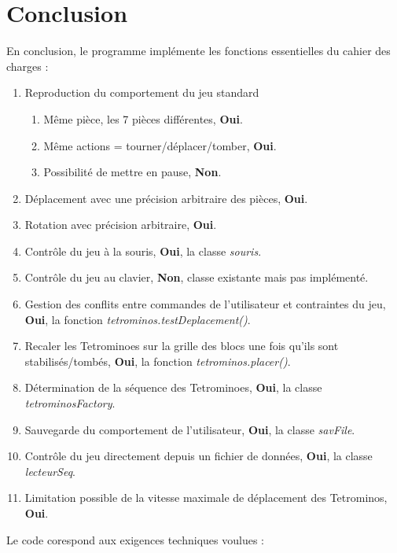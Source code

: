 \documentclass{article}           %
\begin{document}
\section{Conclusion}               %

En conclusion, le programme implémente les fonctions essentielles du cahier des charges :

\begin{enumerate}
  \item Reproduction du comportement du jeu standard 
  		\begin{enumerate}
		  \item Même pièce, les 7 pièces différentes, \textbf{Oui}.	
		  \item Même actions = tourner/déplacer/tomber, \textbf{Oui}.
		  \item Possibilité de mettre en pause, \textbf{Non}.
		\end{enumerate}

  \item Déplacement avec une précision arbitraire des pièces, \textbf{Oui}.
  \item Rotation avec précision arbitraire, \textbf{Oui}.
  \item Contrôle du jeu à la souris, \textbf{Oui}, la classe \emph{souris}.
  \item Contrôle du jeu au clavier, \textbf{Non}, classe existante mais pas implémenté.
  \item Gestion des conflits entre commandes de l'utilisateur et contraintes du jeu, \textbf{Oui}, la fonction \emph{tetrominos.testDeplacement()}.
  \item Recaler les Tetrominoes sur la grille des blocs une fois qu'ils sont stabilisés/tombés, \textbf{Oui}, la fonction \emph{tetrominos.placer()}.
  \item Détermination de la séquence des Tetrominoes, \textbf{Oui}, la classe \emph{tetrominosFactory}.
  \item Sauvegarde du comportement de l'utilisateur, \textbf{Oui}, la classe \emph{savFile}.
  \item Contrôle du jeu directement depuis un fichier de données, \textbf{Oui}, la classe \emph{lecteurSeq}.
  \item Limitation possible de la vitesse maximale de déplacement des Tetrominos, \textbf{Oui}.

 \end{enumerate}

Le code corespond aux exigences techniques voulues : 
\end{document}
